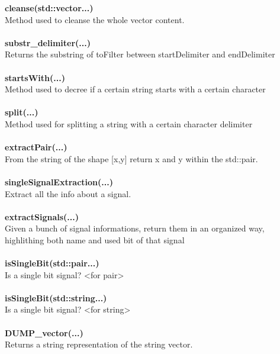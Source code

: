 \documentclass{article}
\newcommand{\sectionbreak}{\clearpage}
\begin{document}
\textbf{cleanse(std::vector...)}\\
Method used to cleanse the whole vector content.\\\\

\textbf{substr\_delimiter(...)}\\
Returns the substring of toFilter between startDelimiter and endDelimiter\\\\

\textbf{startsWith(...)}\\
Method used to decree if a certain string starts with a certain character\\\\

\textbf{split(...)}\\
Method used for splitting a string with a certain character delimiter\\\\

\textbf{extractPair(...)}\\
From the string of the shape [x,y] return x and y within the std::pair.\\\\

\textbf{singleSignalExtraction(...)}\\
Extract all the info about a signal.\\\\

\textbf{extractSignals(...)}\\
Given a bunch of signal informations, return them in an organized way, highlithing both name and used bit of that signal\\\\

\textbf{isSingleBit(std::pair...)}\\
Is a single bit signal? <for pair>\\\\

\textbf{isSingleBit(std::string...)}\\
Is a single bit signal? <for string>\\\\

\textbf{DUMP\_vector(...)}\\
Returns a string representation of the string vector.\\\\

\sectionbreak{\clearpage}
\end{document}
